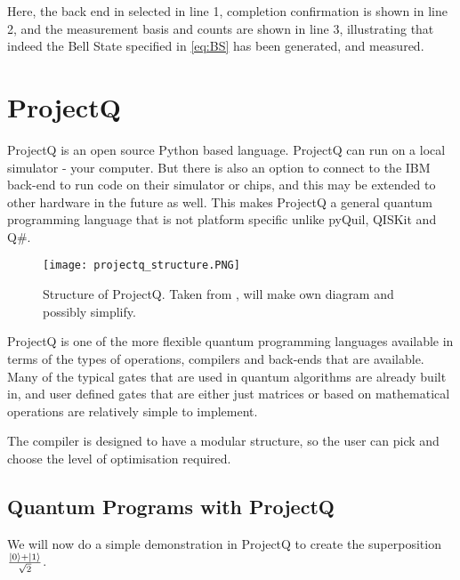 Here, the back end in selected in line 1, completion confirmation is shown in line 2, and the measurement basis and counts are shown in line 3, illustrating that indeed the Bell State specified in \ref{eq:BS} has been generated, and measured. 
\newpage


\section{ProjectQ}

ProjectQ is an open source Python based language. ProjectQ can run on a local simulator - your computer. But there is also an option to connect to the IBM back-end to run code on their simulator or chips, and this may be extended to other hardware in the future as well. This makes ProjectQ a general quantum programming language that is not platform specific unlike pyQuil, QISKit and Q\#.  

\begin{figure}[H]
    \centering
    \texttt{[image: projectq\_structure.PNG]}
    \caption{Structure of ProjectQ. Taken from \cite{projectq2018}, will make own diagram and possibly simplify.}
\end{figure}

ProjectQ is one of the more flexible quantum programming languages available in terms of the types of operations, compilers and back-ends that are available. Many of the typical gates that are used in quantum algorithms are already built in, and user defined gates that are either just matrices or based on mathematical operations are relatively simple to implement. 

The compiler is designed to have a modular structure, so the user can pick and choose the level of optimisation required. 


\subsection*{Quantum Programs with ProjectQ}


We will now do a simple demonstration in ProjectQ to create the superposition $\frac{\left\vert{0}\right\rangle+\left\vert{1}\right\rangle}{\sqrt{2}}$. 

